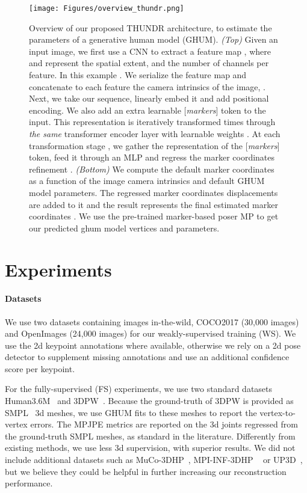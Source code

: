 \documentclass[10pt,twocolumn,letterpaper]{article}
\begin{document}
\begin{figure*}[!ht]
\begin{center}
\texttt{[image: Figures/overview\_thundr.png]}
\end{center}
\vspace{-5mm}
\caption{\small Overview of our proposed THUNDR architecture, to estimate the parameters of a generative human model (GHUM). \textit{(Top)} Given an input image, we first use a CNN to extract a feature map , where  and  represent the spatial extent, and  the number of channels per feature. In this example . We serialize the feature map and concatenate to each feature the camera intrinsics of the image, . Next, we take our sequence, linearly embed it and add positional encoding. We also add an extra learnable [\textit{markers}] token to the input. This representation is iteratively transformed  times through \textit{the same} transformer encoder layer with learnable weights . At each transformation stage , we gather the representation of the [\textit{markers}] token, feed it through an MLP and regress the marker coordinates refinement . \textit{(Bottom)} We compute the default marker coordinates  as a function of the image camera intrinsics and default GHUM model parameters. The regressed marker coordinates displacements are added to it and the result represents the final estimated marker coordinates . We use the pre-trained marker-based poser MP to get our predicted ghum model vertices and parameters.}
\label{fig:THUNDR}
\end{figure*}

\section{Experiments}\label{sec:exps}

\paragraph{Datasets}
We use two datasets containing images in-the-wild, COCO2017 \cite{lin2014microsoft} (30,000 images) and OpenImages \cite{OpenImages} (24,000 images) for our weakly-supervised training (WS). We use the 2d keypoint annotations where available, otherwise we rely on a 2d pose detector to supplement missing annotations and use an additional confidence score per keypoint.

For the fully-supervised (FS) experiments, we use two standard datasets Human3.6M~\cite{Ionescu14pami} and 3DPW~\cite{vonMarcard2018}. Because the ground-truth of 3DPW is provided as SMPL~\cite{SMPL2015} 3d meshes, we use GHUM fits to these meshes to report the vertex-to-vertex errors. The MPJPE metrics are reported on the 3d joints regressed from the ground-truth SMPL meshes, as standard in the literature. Differently from existing methods, we use less 3d supervision, with superior results. We did not include additional datasets such as MuCo-3DHP~\cite{mehta2018single}, MPI-INF-3DHP ~\cite{mehta2017vnect} or UP3D~\cite{Lassner2017UP3D}, but we believe they could be helpful in further increasing our reconstruction performance.
\end{document}
